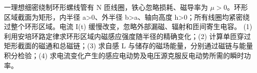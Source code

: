 一理想细密绕制环形螺线管有 N 匝线圈，铁心忽略损耗、磁导率为 \(\mu >0\)。环形区域截面为矩形，内半径 a>0、外半径 b>a、轴向高度 h>0；所有线圈均紧密绕过整个环形区域。电流 I(t) 缓慢改变，忽略外部漏磁、辐射和匝间寄生电容。
(1) 利用安培环路定律求环形区域内磁感应强度随半径的精确变化；(2) 计算单匝穿过矩形截面的磁通和总磁链；(3) 求自感 L 与储存的磁场能量，分别通过磁链与能量积分检验；(4) 求电流变化产生的感应电动势及电压源克服反电动势所需的瞬时功率。
